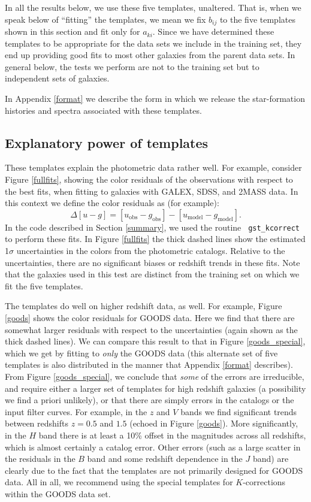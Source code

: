 \documentclass[10pt,preprint]{aastex}
\begin{document}
In all the results below, we use these five templates, unaltered. That
is, when we speak below of ``fitting'' the templates, we mean we fix
$b_{ij}$ to the five templates shown in this section and fit only for
$a_{ki}$. Since we have determined these templates to be appropriate
for the data sets we include in the training set, they end up
providing good fits to most other galaxies from the parent data sets.
In general below, the tests we perform are not to the training set but
to independent sets of galaxies.

In Appendix \ref{format} we describe the form in which we release the
star-formation histories and spectra associated with these templates.

\subsection{Explanatory power of templates}

These templates explain the photometric data rather well. For example,
consider Figure \ref{fullfits}, showing the color residuals of the
observations with respect to the best fits, when fitting to galaxies
with GALEX, SDSS, and 2MASS data. In this context we define the color
residuals as (for example):
\begin{equation}
\Delta [u-g] = [u_{\mathrm{obs}}- g_{\mathrm{obs}}] -
[u_{\mathrm{model}}- g_{\mathrm{model}}] .
\end{equation}
In the code described in Section \ref{summary}, we used the routine {\tt
gst\_kcorrect} to perform these fits.  In Figure \ref{fullfits} the
thick dashed lines show the estimated 1$\sigma$ uncertainties in the
colors from the photometric catalogs. Relative to the uncertainties,
there are no significant biases or redshift trends in these fits. Note
that the galaxies used in this test are distinct from the training set
on which we fit the five templates.

The templates do well on higher redshift data, as well. For example,
Figure \ref{goods} shows the color residuals for GOODS data. Here we
find that there are somewhat larger residuals with respect to the
uncertainties (again shown as the thick dashed lines). We can compare
this result to that in Figure \ref{goods_special}, which we get by
fitting to {\it only} the GOODS data (this alternate set of five
templates is also distributed in the manner that Appendix \ref{format}
describes). From Figure \ref{goods_special}, we conclude that {\it
some} of the errors are irreducible, and require either a larger set
of templates for high redshift galaxies (a possibility we find a
priori unlikely), or that there are simply errors in the catalogs or
the input filter curves. For example, in the $z$ and $V$ bands we find
significant trends between redshifts $z=0.5$ and $1.5$ (echoed in
Figure \ref{goods}). More significantly, in the $H$ band there is at
least a 10\% offset in the magnitudes across all redshifts, which is
almost certainly a catalog error. Other errors (such as a large
scatter in the residuals in the $B$ band and some redshift dependence
in the $J$ band) are clearly due to the fact that the templates are
not primarily designed for GOODS data. All in all, we recommend using
the special templates for $K$-corrections within the GOODS data set.
\end{document}
